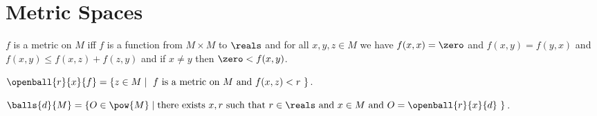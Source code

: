 





\section{Metric Spaces}

\begin{definition}\label{metric}
    $f$ is a metric on $M$ iff $f$ is a function from $M \times M$ to $\reals$ and
    for all $x,y,z \in M$ we have 
        $f(x,x) = \zero$ and 
        $f(x,y) = f(y,x)$ and
        $f(x,y) \leq f(x,z) + f(z,y)$ and
        if $x \neq y$ then $\zero < f(x,y)$.
\end{definition}

\begin{definition}\label{open_ball}
    $\openball{r}{x}{f} = \{z \in M \mid \text{ $f$ is a metric on $M$ and $f(x,z) < r$ } \}$.
\end{definition}





\begin{definition}\label{set_of_balls}
    $\balls{d}{M} = \{ O \in \pow{M} \mid \text{there exists $x,r$ such that $r \in \reals$ and $x \in M$ and $O = \openball{r}{x}{d}$ } \}$.
\end{definition}


%    

